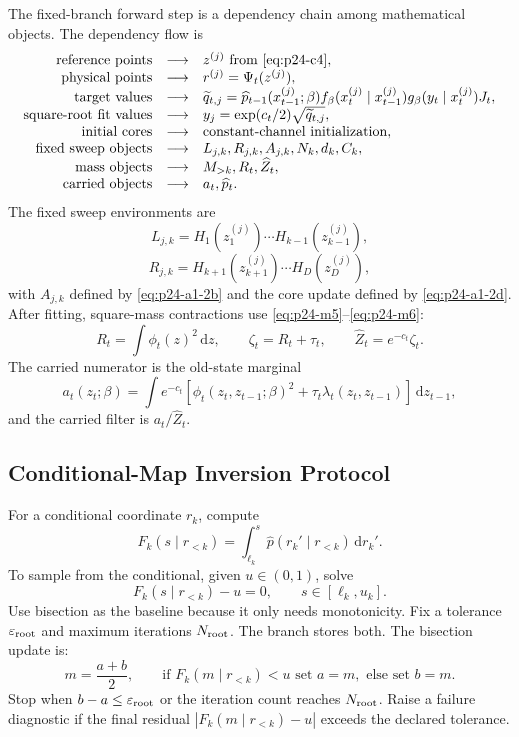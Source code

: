 \documentclass[11pt]{article}
\numberwithin{equation}{section}
\newcommand{\dd}{\,\mathrm d}
\begin{document}
The fixed-branch forward step is a dependency chain among mathematical
objects.  The dependency flow is
\begin{equation}
\begin{array}{rcl}
\text{reference points} &\longrightarrow& z^{(j)} \text{ from \eqref{eq:p24-c4}},\\
\text{physical points} &\longrightarrow& r^{(j)}=\Psi_t(z^{(j)}),\\
\text{target values} &\longrightarrow&
    \widetilde q_{t,j}
    =
    \widehat p_{t-1}(x_{t-1}^{(j)};\beta)
    f_\beta(x_t^{(j)}\mid x_{t-1}^{(j)})
    g_\beta(y_t\mid x_t^{(j)})J_t,\\
\text{square-root fit values} &\longrightarrow&
    y_j=\exp(c_t/2)\sqrt{\widetilde q_{t,j}},\\
\text{initial cores} &\longrightarrow&
    \text{constant-channel initialization},\\
\text{fixed sweep objects} &\longrightarrow&
    L_{j,k},R_{j,k},A_{j,k},N_k,d_k,C_k,\\
\text{mass objects} &\longrightarrow&
    M_{>k},R_t,\widehat Z_t,\\
\text{carried objects} &\longrightarrow&
    a_t,\widehat p_t.
\end{array}
\label{eq:p24-c12}
\end{equation}
The fixed sweep environments are
\[
    L_{j,k}=H_1(z_1^{(j)})\cdots H_{k-1}(z_{k-1}^{(j)}),
\]
\[
    R_{j,k}=H_{k+1}(z_{k+1}^{(j)})\cdots H_D(z_D^{(j)}),
\]
with \(A_{j,k}\) defined by \eqref{eq:p24-a1-2b} and the core update defined by \eqref{eq:p24-a1-2d}.
After fitting, square-mass contractions use \eqref{eq:p24-m5}--\eqref{eq:p24-m6}:
\[
    R_t=\int\phi_t(z)^2\dd z,\qquad
    \zeta_t=R_t+\tau_t,\qquad
    \widehat Z_t=e^{-c_t}\zeta_t.
\]
The carried numerator is the old-state marginal
\[
    a_t(z_t;\beta)
    =
    \int
    e^{-c_t}\left[\phi_t(z_t,z_{t-1};\beta)^2
    +\tau_t\lambda_t(z_t,z_{t-1})\right]\dd z_{t-1},
\]
and the carried filter is \(a_t/\widehat Z_t\).

\subsection{Conditional-Map Inversion Protocol}

For a conditional coordinate \(r_k\), compute
\[
    F_k(s\mid r_{<k})
    =
    \int_{\ell_k}^{s}\widehat p(r_k'\mid r_{<k})\dd r_k'.
\]
To sample from the conditional, given \(u\in(0,1)\), solve
\[
    F_k(s\mid r_{<k})-u=0,\qquad s\in[\ell_k,u_k].
\]
Use bisection as the baseline because it only needs monotonicity.  Fix a
tolerance \(\varepsilon_{\rm root}\) and maximum iterations \(N_{\rm root}\).
The branch stores both.  The bisection update is:
\[
    m=\frac{a+b}{2},\qquad
    \text{if }F_k(m\mid r_{<k})<u\text{ set }a=m,\text{ else set }b=m.
\]
Stop when \(b-a\le\varepsilon_{\rm root}\) or the iteration count reaches
\(N_{\rm root}\).  Raise a failure diagnostic if the final residual
\(|F_k(m\mid r_{<k})-u|\) exceeds the declared tolerance.
\end{document}
